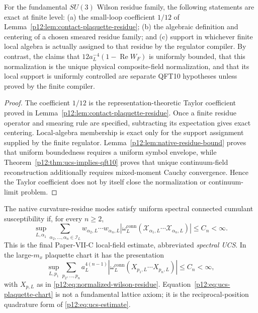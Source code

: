 \documentclass[12pt,a4paper]{article}
\begin{document}
\begin{proposition}
\label{p12:prop:qft10a-e-closed}
For the fundamental \(SU(3)\) Wilson residue family, the following statements are exact at finite level: (a) the small-loop coefficient \(1/12\) of Lemma~\ref{p12:lem:contact-plaquette-residue}; (b) the algebraic definition and centering of a chosen smeared residue family; and (c) support in whichever finite local algebra is actually assigned to that residue by the regulator compiler.  By contrast, the claims that \(12a_L^{-4}(1-\operatorname{Re}W_F)\) is uniformly bounded, that this normalization is the unique physical composite-field normalization, and that its local support is uniformly controlled are separate QFT10 hypotheses unless proved by the finite compiler.
\end{proposition}
\begin{proof}
The coefficient \(1/12\) is the representation-theoretic Taylor coefficient proved in Lemma~\ref{p12:lem:contact-plaquette-residue}.  Once a finite residue operator and smearing rule are specified, subtracting its expectation gives exact centering.  Local-algebra membership is exact only for the support assignment supplied by the finite regulator.  Lemma~\ref{p12:lem:native-residue-bound} proves that uniform boundedness requires a uniform symbol envelope, while Theorem~\ref{p12:thm:ucs-implies-qft10} proves that unique continuum-field reconstruction additionally requires mixed-moment Cauchy convergence.  Hence the Taylor coefficient does not by itself close the normalization or continuum-limit problem.
\end{proof}

\begin{definition}
\label{p12:def:uniform-small-loop-cumulant-susceptibility}
The native curvature-residue modes satisfy uniform spectral connected cumulant susceptibility if, for every \(n\ge2\),
\begin{equation}
\label{p12:eq:ucs-estimate}
\sup_{L,\alpha_1}
\sum_{\alpha_2,\ldots,\alpha_n\in\mathcal I_L}
 w_{\alpha_2,L}\cdots w_{\alpha_n,L}
\left|
\omega_L^{\mathrm{conn}}
\left(\mathcal X_{\alpha_1,L}\cdots \mathcal X_{\alpha_n,L}\right)
\right|
\le C_n<\infty .
\end{equation}
This is the final Paper-VII-C local-field estimate, abbreviated \emph{spectral UCS}.  In the large-\(m_x\) plaquette chart it has the presentation
\begin{equation}
\label{p12:eq:ucs-plaquette-chart}
\sup_{L,p_1}
\sum_{p_2,\ldots,p_n}
 a_L^{4(n-1)}
\left|
\omega_L^{\mathrm{conn}}
\left(X_{p_1,L}\cdots X_{p_n,L}\right)
\right|
\le C_n<\infty ,
\end{equation}
with \(X_{p,L}\) as in \eqref{p12:eq:normalized-wilson-residue}.  Equation~\eqref{p12:eq:ucs-plaquette-chart} is not a fundamental lattice axiom; it is the reciprocal-position quadrature form of \eqref{p12:eq:ucs-estimate}.
\end{definition}
\end{document}
